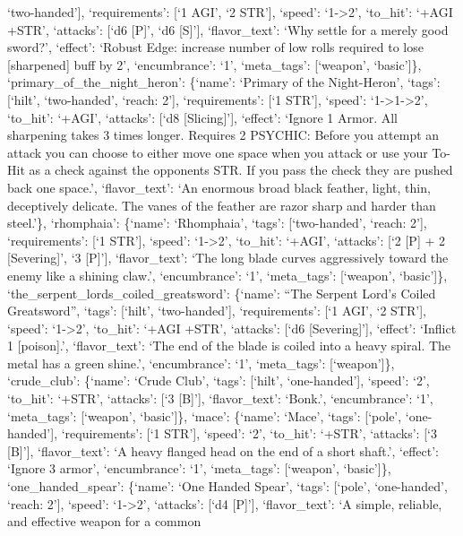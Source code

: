 \documentclass[
  letterpaper,
  DIV=11,
  numbers=noendperiod]{scrartcl}
\begin{document}
`two-handed'{]}, `requirements': {[}`1 AGI', `2 STR'{]}, `speed':
`1-\textgreater2', `to\_hit': `+AGI +STR', `attacks': {[}`d6 {[}P{]}',
`d6 {[}S{]}'{]}, `flavor\_text': `Why settle for a merely good sword?',
`effect': `Robust Edge: increase number of low rolls required to lose
{[}sharpened{]} buff by 2', `encumbrance': `1', `meta\_tags':
{[}`weapon', `basic'{]}\}, `primary\_of\_the\_night\_heron': \{`name':
`Primary of the Night-Heron', `tags': {[}`hilt', `two-handed', `reach:
2'{]}, `requirements': {[}`1 STR'{]}, `speed':
`1-\textgreater1-\textgreater2', `to\_hit': `+AGI', `attacks': {[}`d8
{[}Slicing{]}'{]}, `effect': `Ignore 1 Armor. All sharpening takes 3
times longer. Requires 2 PSYCHIC: Before you attempt an attack you can
choose to either move one space when you attack or use your To-Hit as a
check against the opponents STR. If you pass the check they are pushed
back one space.', `flavor\_text': `An enormous broad black feather,
light, thin, deceptively delicate. The vanes of the feather are razor
sharp and harder than steel.'\}, `rhomphaia': \{`name': `Rhomphaia',
`tags': {[}`two-handed', `reach: 2'{]}, `requirements': {[}`1 STR'{]},
`speed': `1-\textgreater2', `to\_hit': `+AGI', `attacks': {[}`2 {[}P{]}
+ 2 {[}Severing{]}', `3 {[}P{]}'{]}, `flavor\_text': `The long blade
curves aggressively toward the enemy like a shining claw.',
`encumbrance': `1', `meta\_tags': {[}`weapon', `basic'{]}\},
`the\_serpent\_lords\_coiled\_greatsword': \{`name': ``The Serpent
Lord's Coiled Greatsword'', `tags': {[}`hilt', `two-handed'{]},
`requirements': {[}`1 AGI', `2 STR'{]}, `speed': `1-\textgreater2',
`to\_hit': `+AGI +STR', `attacks': {[}`d6 {[}Severing{]}'{]}, `effect':
`Inflict 1 {[}poison{]}.', `flavor\_text': `The end of the blade is
coiled into a heavy spiral. The metal has a green shine.',
`encumbrance': `1', `meta\_tags': {[}`weapon'{]}\}, `crude\_club':
\{`name': `Crude Club', `tags': {[}`hilt', `one-handed'{]}, `speed':
`2', `to\_hit': `+STR', `attacks': {[}`3 {[}B{]}'{]}, `flavor\_text':
`Bonk.', `encumbrance': `1', `meta\_tags': {[}`weapon', `basic'{]}\},
`mace': \{`name': `Mace', `tags': {[}`pole', `one-handed'{]},
`requirements': {[}`1 STR'{]}, `speed': `2', `to\_hit': `+STR',
`attacks': {[}`3 {[}B{]}'{]}, `flavor\_text': `A heavy flanged head on
the end of a short shaft.', `effect': `Ignore 3 armor', `encumbrance':
`1', `meta\_tags': {[}`weapon', `basic'{]}\}, `one\_handed\_spear':
\{`name': `One Handed Spear', `tags': {[}`pole', `one-handed', `reach:
2'{]}, `speed': `1-\textgreater2', `attacks': {[}`d4 {[}P{]}'{]},
`flavor\_text': `A simple, reliable, and effective weapon for a common
\end{document}
